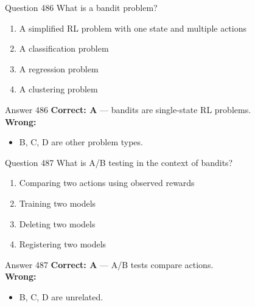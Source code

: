 \documentclass[aspectratio=169,11pt]{beamer}
\begin{document}
	\begin{frame}{Question 486}
		What is a bandit problem?
		\begin{enumerate}[label=\Alph*.]
			\item A simplified RL problem with one state and multiple actions
			\item A classification problem
			\item A regression problem
			\item A clustering problem
		\end{enumerate}
	\end{frame}
	\begin{frame}{Answer 486}
		\textbf{Correct: A} --- bandits are single-state RL problems.\\
		\vspace{0.5em}
		\textbf{Wrong:}
		\begin{itemize}
			\item B, C, D are other problem types.
		\end{itemize}
	\end{frame}
	
	\begin{frame}{Question 487}
		What is A/B testing in the context of bandits?
		\begin{enumerate}[label=\Alph*.]
			\item Comparing two actions using observed rewards
			\item Training two models
			\item Deleting two models
			\item Registering two models
		\end{enumerate}
	\end{frame}
	\begin{frame}{Answer 487}
		\textbf{Correct: A} --- A/B tests compare actions.\\
		\vspace{0.5em}
		\textbf{Wrong:}
		\begin{itemize}
			\item B, C, D are unrelated.
		\end{itemize}
	\end{frame}
	
\end{document}
